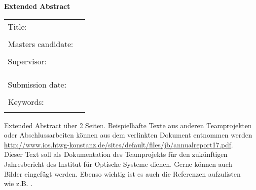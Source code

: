 \thispagestyle{plain}
\vspace*{11pt}
\begin{center}
	{\LARGE \textbf{\textsf{Extended Abstract}}}
\end{center}

\bigskip
\begin{center}
	\begin{tabular}{p{3.2cm}p{9.6cm}}
	Title: & \thema \\
	& \\
	Masters candidate: & \autor \\
	& \\
	Supervisor: & \firma \\[1.1ex] & \prueferA  \\[.5ex]
	&  \prueferB \\
	& \\
	Submission date: & \abgabedatum \\
	& \\
	Keywords: & \schlagworte \\
	& \\
	\end{tabular}
\end{center}

\bigskip

\noindent
Extended Abstract über 2 Seiten. Beispielhafte Texte aus anderen Teamprojekten oder Abschlussarbeiten können aus dem verlinkten Dokument entnommen werden \href{http://www.ios.htwg-konstanz.de/sites/default/files/jb/annualreport17.pdf}{http://www.ios.htwg-konstanz.de/sites/default/files/jb/annualreport17.pdf}.\\

\noindent Dieser Text soll als Dokumentation des Teamprojekts für den zukünftigen Jahresbericht des Institut für Optische Systeme dienen. Gerne können auch Bilder eingefügt werden. Ebenso wichtig ist es auch die Referenzen aufzulisten wie z.B. \cite{goodfellow2016}.


